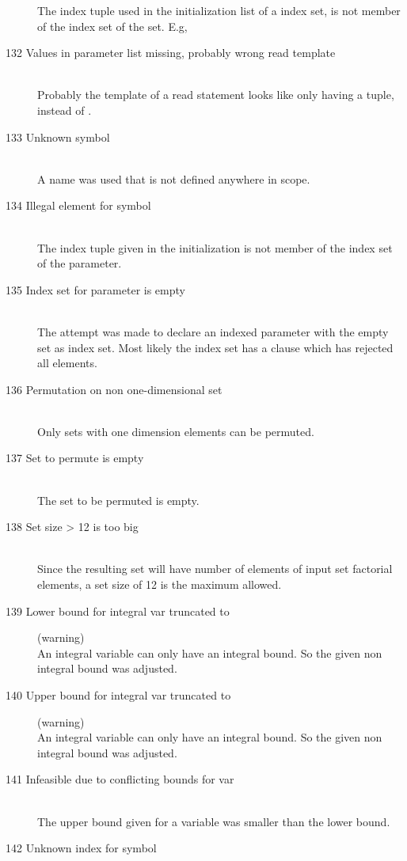 \begin{description}
   The index tuple used in the initialization list of a index set, is
   not member of the index set of the set.
   E.g, 
\item[132 Values in parameter list missing, probably wrong read
  template]\ \\
  Probably the template of a read statement looks
  like  only having a tuple, instead of .
\item[133 Unknown symbol \code{xxx}]\ \\
  A name was used that is not defined anywhere in scope.
\item[134 Illegal element \code{xxx} for symbol]\ \\
  The index tuple given in the initialization is not member of the
  index set of the parameter.
\item[135 Index set for parameter \code{xxx} is empty]\ \\
  The attempt was made to declare an indexed parameter with the
  empty set as index set. Most likely the index set has a 
  clause which has rejected all elements.
\item[136 Permutation on non one-dimensional set]\ \\
  Only sets with one dimension elements can be permuted.
\item[137 Set to permute is empty]\ \\
  The set to be permuted is empty.
\item[138 Set size \code{xxx} > 12 is too big]\ \\
  Since the resulting set will have number of elements of input set
  factorial elements, a set size of 12 is the maximum allowed.
\item[139 Lower bound for integral var \code{xxx} truncated to
  \code{yyy}] (warning)\ \\
  An integral variable can only have an integral bound. So the given
  non integral bound was adjusted.
\item[140 Upper bound for integral var \code{xxx} truncated to
  \code{yyy}] (warning)\ \\
  An integral variable can only have an integral bound. So the given
  non integral bound was adjusted.
\item[141 Infeasible due to conflicting bounds for var \code{xxx}]\ \\
  The upper bound given for a variable was smaller than the lower bound.
\item[142 Unknown index \code{xxx} for symbol \code{yyy}]\ \\

\end{description}
